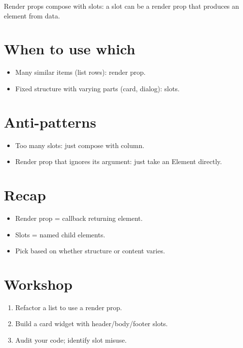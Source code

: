 Render props compose with slots: a slot can be a render
prop that produces an element from data.

\section{When to use which}

\begin{itemize}[leftmargin=*]
  \item Many similar items (list rows): render prop.
  \item Fixed structure with varying parts (card,
    dialog): slots.
\end{itemize}

\section{Anti-patterns}

\begin{itemize}[leftmargin=*]
  \item Too many slots: just compose with column.
  \item Render prop that ignores its argument: just take
    an Element directly.
\end{itemize}

\section{Recap}

\begin{recap}
\begin{itemize}[leftmargin=*]
  \item Render prop = callback returning element.
  \item Slots = named child elements.
  \item Pick based on whether structure or content varies.
\end{itemize}
\end{recap}

\section*{Workshop}

\begin{enumerate}[leftmargin=*]
  \item Refactor a list to use a render prop.
  \item Build a card widget with header/body/footer slots.
  \item Audit your code; identify slot misuse.
\end{enumerate}
